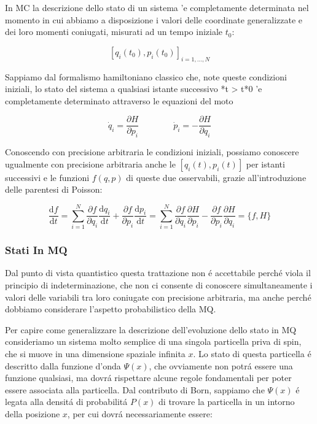 In MC la descrizione dello stato di un sistema 'e completamente determinata nel momento in cui abbiamo a disposizione i valori delle coordinate generalizzate e dei loro momenti coniugati, misurati ad un tempo iniziale $t_0$:

$$[q_i(t_0), p_i(t_0)]_{i=1, \ldots, N}$$

Sappiamo dal formalismo hamiltoniano classico che, note queste condizioni iniziali, lo stato del sistema a qualsiasi istante successivo *t > t*0 'e completamente determinato attraverso le equazioni del moto

\begin{equation}
	{\dot{q}}_{i}={\frac{\partial H}{\partial p_{i}}}\qquad\qquad{\dot{p}}_{i}=-{\frac{\partial H}{\partial q_{i}}}
\end{equation}

Conoscendo con precisione arbitraria le condizioni iniziali, possiamo conoscere ugualmente con precisione arbitraria anche le $[q_i(t), p_i(t)]$ per istanti successivi e le funzioni $f(q, p)$ di queste due osservabili, grazie all'introduzione delle parentesi di Poisson:

$${\frac{\mathrm{d}f}{\mathrm{d}t}}=\sum_{i=1}^{N}{\frac{\partial f}{\partial q_{i}}}{\frac{\mathrm{d}q_{i}}{\mathrm{d}t}}+{\frac{\partial f}{\partial p_{i}}}{\frac{\mathrm{d}p_{i}}{\mathrm{d}t}}=\sum_{i=1}^{N}{\frac{\partial f}{\partial q_{i}}}{\frac{\partial H}{\partial p_{i}}}-{\frac{\partial f}{\partial p_{i}}}{\frac{\partial H}{\partial q_{i}}}=\{f,H\}$$


\subsubsection{Stati In MQ}

Dal punto di vista quantistico questa trattazione non \'e accettabile perch\'e viola il principio di indeterminazione, che non ci consente di conoscere simultaneamente i valori delle variabili tra loro coniugate con precisione arbitraria, ma anche perch\'e dobbiamo considerare l'aspetto probabilistico della MQ.

Per capire come generalizzare la descrizione dell'evoluzione dello stato in MQ consideriamo un sistema molto semplice di una singola particella priva di spin, che si muove in una dimensione spaziale infinita $x$. Lo stato di questa particella \'e descritto dalla funzione d'onda $\Psi(x)$, che ovviamente non potr\'a essere una funzione qualsiasi, ma dovr\'a rispettare alcune regole fondamentali per poter essere associata alla particella. Dal contributo di Born, sappiamo che $\Psi(x)$ \'e legata alla densit\'a di probabilit\'a $P(x)$ di trovare la particella in un intorno della posizione $x$, per cui dovr\'a necessariamente essere:

